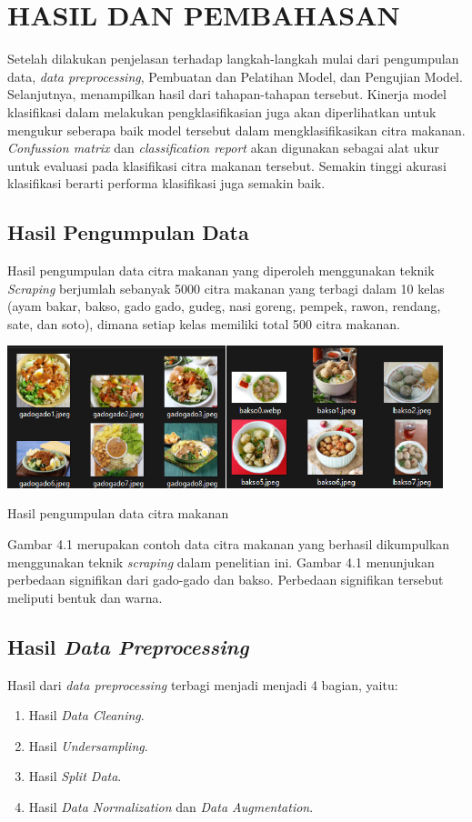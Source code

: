 \chapter{HASIL DAN PEMBAHASAN}

Setelah dilakukan penjelasan terhadap langkah-langkah mulai dari pengumpulan data, \textit{data preprocessing}, Pembuatan dan Pelatihan Model, dan Pengujian Model. Selanjutnya, menampilkan hasil dari tahapan-tahapan tersebut. Kinerja model klasifikasi dalam melakukan pengklasifikasian juga akan diperlihatkan untuk mengukur seberapa baik model tersebut dalam mengklasifikasikan citra makanan. \textit{Confussion matrix} dan \textit{classification report} akan digunakan sebagai alat ukur untuk evaluasi pada klasifikasi citra makanan tersebut. Semakin tinggi akurasi klasifikasi berarti performa klasifikasi juga semakin baik.

\section{Hasil Pengumpulan Data}
Hasil pengumpulan data citra makanan yang diperoleh menggunakan teknik \textit{Scraping} berjumlah sebanyak 5000 citra makanan yang terbagi dalam 10 kelas (ayam bakar, bakso, gado gado, gudeg, nasi goreng, pempek, rawon, rendang, sate, dan soto), dimana setiap kelas memiliki total 500 citra makanan.

\begin{afigure}
    \includegraphics[width=0.95\textwidth, center]{images/citra-makanan.png}
    \caption{Hasil pengumpulan data citra makanan}
    \label{fig:citra-makanan}
\end{afigure}

Gambar 4.1 merupakan contoh data citra makanan yang berhasil dikumpulkan menggunakan teknik \textit{scraping} dalam penelitian ini. Gambar 4.1 menunjukan perbedaan signifikan dari gado-gado dan bakso. Perbedaan signifikan tersebut meliputi bentuk dan warna.

\section{Hasil \textit{Data Preprocessing}}
Hasil dari \textit{data preprocessing} terbagi menjadi menjadi 4 bagian, yaitu:
\begin{enumerate}
    \item Hasil \textit{Data Cleaning}.
    \item Hasil \textit{Undersampling}.
    \item Hasil \textit{Split Data}.
    \item Hasil \textit{Data Normalization} dan \textit{Data Augmentation}.
\end{enumerate}

